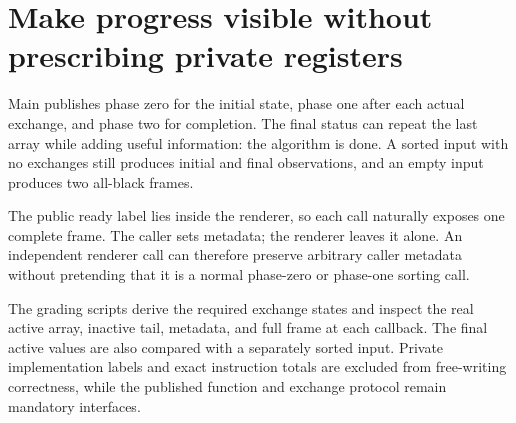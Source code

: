 \section{Make progress visible without prescribing private
  registers}\label{009-sorting-visualizer-p09-make-progress-visible-without-prescribing-private-registers}

Main publishes phase zero for the initial state, phase one after each
actual exchange, and phase two for completion. The final status can
repeat the last array while adding useful information: the algorithm is
done. A sorted input with no exchanges still produces initial and final
observations, and an empty input produces two all-black frames.

The public ready label lies inside the renderer, so each call naturally
exposes one complete frame. The caller sets metadata; the renderer
leaves it alone. An independent renderer call can therefore preserve
arbitrary caller metadata without pretending that it is a normal
phase-zero or phase-one sorting call.

The grading scripts derive the required exchange states and inspect the
real active array, inactive tail, metadata, and full frame at each
callback. The final active values are also compared with a separately
sorted input. Private implementation labels and exact instruction totals
are excluded from free-writing correctness, while the published function
and exchange protocol remain mandatory interfaces.
